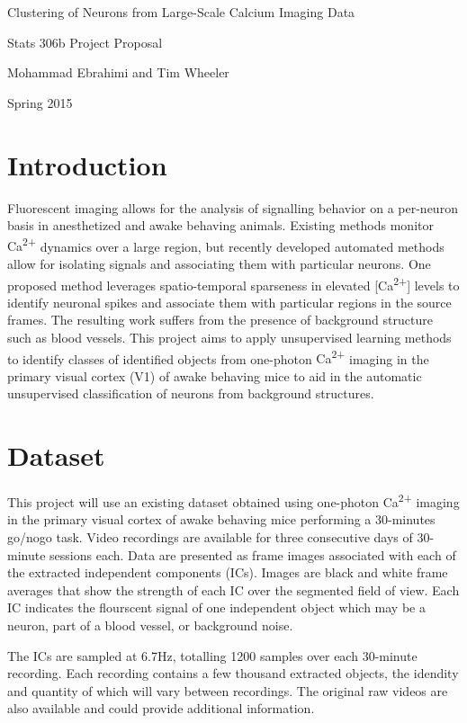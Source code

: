 \documentclass[11pt]{article}
\newcommand{\calcium}[0]{Ca\textsuperscript{2+}}
\begin{document}
\begin{center}
    {\LARGE Clustering of Neurons from Large-Scale Calcium Imaging Data}

    Stats 306b Project Proposal

    Mohammad Ebrahimi and Tim Wheeler

    Spring 2015
\end{center}

\section{Introduction}

Fluorescent imaging allows for the analysis of signalling behavior on a per-neuron basis in anesthetized and awake behaving animals. 
Existing methods monitor {\calcium} dynamics over a large region, but recently developed automated methods allow for isolating signals and associating them with particular neurons.
One proposed method leverages spatio-temporal sparseness in elevated [\calcium] levels to identify neuronal spikes and associate them with particular regions in the source frames.
The resulting work suffers from the presence of background structure such as blood vessels.
This project aims to apply unsupervised learning methods to identify classes of identified objects from one-photon {\calcium} imaging in the primary visual cortex (V1) of awake behaving mice to aid in the automatic unsupervised classification of neurons from background structures.

\section{Dataset}

This project will use an existing dataset obtained using one-photon {\calcium} imaging in the primary visual cortex of awake behaving mice performing a \num{30}-minutes go/nogo task.
Video recordings are available for three consecutive days of \num{30}-minute sessions each.
Data are presented as frame images associated with each of the extracted independent components (ICs).
Images are black and white frame averages that show the strength of each IC over the segmented field of view. 
Each IC indicates the flourscent signal of one independent object which may be a neuron, part of a blood vessel, or background noise.

The ICs are sampled at \num{6.7}\si{Hz}, totalling \num{1200} samples over each \num{30}-minute recording. 
Each recording contains a few thousand extracted objects, the idendity and quantity of which will vary between recordings.
The original raw videos are also available and could provide additional information.
\end{document}
